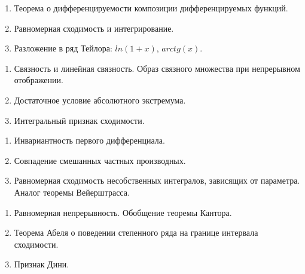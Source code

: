 \documentclass{article}
\newcounter{ticket}[subsection]
\newenvironment{ticket}[1][]{\item[Билет \ifthenelse{\equal{#1}{}}{}{\setcounter{ticket}{#1}}\theticket\refstepcounter{ticket}:]\phantom{}\begin{enumerate}}{\end{enumerate}}
\begin{document}
\begin{description}
\begin{ticket}
	\end{ticket}
	\begin{ticket}
		\item Теорема о дифференцируемости композиции дифференцируемых
		      функций.
		\item Равномерная сходимость и интегрирование.
		\item Разложение в ряд Тейлора: $ln(1 + x)$, $arc tg(x)$.
	\end{ticket}
	\begin{ticket}
		\item Связность и линейная связность. Образ связного множества
		      при непрерывном отображении.
		\item Достаточное условие абсолютного экстремума.
		\item Интегральный признак сходимости.
	\end{ticket}
	\begin{ticket}
		\item Инвариантность первого дифференциала.
		\item Совпадение смешанных частных производных.
		\item Равномерная сходимость несобственных интегралов,
		      зависящих от параметра. Аналог теоремы Вейерштрасса.
	\end{ticket}
	\begin{ticket}
		\item Равномерная непрерывность. Обобщение теоремы Кантора.
		\item Теорема Абеля о поведении степенного ряда на границе
		      интервала сходимости.
		\item Признак Дини.
	\end{ticket}
\end{description}
\end{document}
